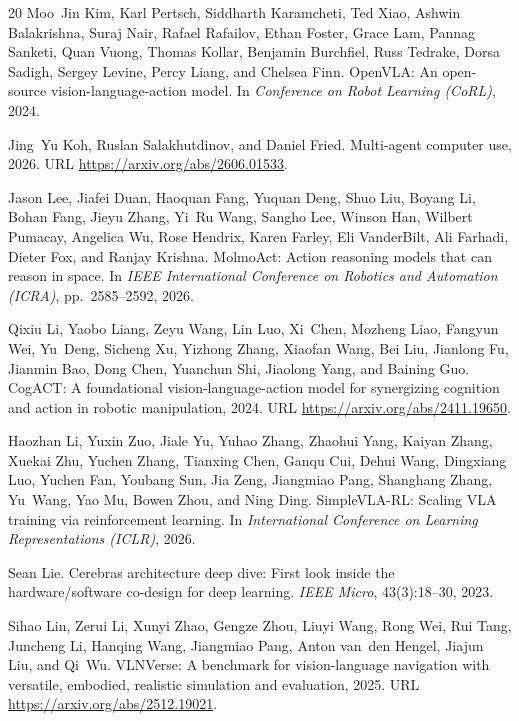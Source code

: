 \documentclass{article}
\begin{document}
\begin{thebibliography}{20}
Moo~Jin Kim, Karl Pertsch, Siddharth Karamcheti, Ted Xiao, Ashwin Balakrishna, Suraj Nair, Rafael Rafailov, Ethan Foster, Grace Lam, Pannag Sanketi, Quan Vuong, Thomas Kollar, Benjamin Burchfiel, Russ Tedrake, Dorsa Sadigh, Sergey Levine, Percy Liang, and Chelsea Finn.
\newblock OpenVLA: An open-source vision-language-action model.
\newblock In \emph{Conference on Robot Learning (CoRL)}, 2024.

Jing~Yu Koh, Ruslan Salakhutdinov, and Daniel Fried.
\newblock Multi-agent computer use, 2026.
\newblock URL \url{https://arxiv.org/abs/2606.01533}.

Jason Lee, Jiafei Duan, Haoquan Fang, Yuquan Deng, Shuo Liu, Boyang Li, Bohan Fang, Jieyu Zhang, Yi~Ru Wang, Sangho Lee, Winson Han, Wilbert Pumacay, Angelica Wu, Rose Hendrix, Karen Farley, Eli VanderBilt, Ali Farhadi, Dieter Fox, and Ranjay Krishna.
\newblock MolmoAct: Action reasoning models that can reason in space.
\newblock In \emph{IEEE International Conference on Robotics and Automation (ICRA)}, pp.\ 2585--2592, 2026.

Qixiu Li, Yaobo Liang, Zeyu Wang, Lin Luo, Xi~Chen, Mozheng Liao, Fangyun Wei, Yu~Deng, Sicheng Xu, Yizhong Zhang, Xiaofan Wang, Bei Liu, Jianlong Fu, Jianmin Bao, Dong Chen, Yuanchun Shi, Jiaolong Yang, and Baining Guo.
\newblock CogACT: A foundational vision-language-action model for synergizing cognition and action in robotic manipulation, 2024.
\newblock URL \url{https://arxiv.org/abs/2411.19650}.

Haozhan Li, Yuxin Zuo, Jiale Yu, Yuhao Zhang, Zhaohui Yang, Kaiyan Zhang, Xuekai Zhu, Yuchen Zhang, Tianxing Chen, Ganqu Cui, Dehui Wang, Dingxiang Luo, Yuchen Fan, Youbang Sun, Jia Zeng, Jiangmiao Pang, Shanghang Zhang, Yu~Wang, Yao Mu, Bowen Zhou, and Ning Ding.
\newblock SimpleVLA-RL: Scaling VLA training via reinforcement learning.
\newblock In \emph{International Conference on Learning Representations (ICLR)}, 2026.

Sean Lie.
\newblock Cerebras architecture deep dive: First look inside the hardware/software co-design for deep learning.
\newblock \emph{IEEE Micro}, 43(3):18--30, 2023.

Sihao Lin, Zerui Li, Xunyi Zhao, Gengze Zhou, Liuyi Wang, Rong Wei, Rui Tang, Juncheng Li, Hanqing Wang, Jiangmiao Pang, Anton van~den Hengel, Jiajun Liu, and Qi~Wu.
\newblock VLNVerse: A benchmark for vision-language navigation with versatile, embodied, realistic simulation and evaluation, 2025.
\newblock URL \url{https://arxiv.org/abs/2512.19021}.


\end{thebibliography}
\end{document}
